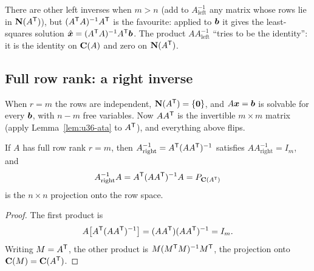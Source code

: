 There are other left inverses when $m>n$ (add to $A^{-1}_{\text{left}}$ any matrix whose rows lie in $\mathbf{N}(A^{\mathsf{T}})$), but $(A^{\mathsf{T}} A)^{-1}A^{\mathsf{T}}$ is the favourite: applied to $\boldsymbol{b}$ it gives the least-squares solution $\hat{\boldsymbol{x}}=(A^{\mathsf{T}} A)^{-1}A^{\mathsf{T}}\boldsymbol{b}$. The product $AA^{-1}_{\text{left}}$ ``tries to be the identity'': it is the identity on $\mathbf{C}(A)$ and zero on $\mathbf{N}(A^{\mathsf{T}})$.

\subsection{Full row rank: a right inverse}

When $r=m$ the rows are independent, $\mathbf{N}(A^{\mathsf{T}})=\{\boldsymbol{0}\}$, and $A\boldsymbol{x}=\boldsymbol{b}$ is solvable for every $\boldsymbol{b}$, with $n-m$ free variables. Now $AA^{\mathsf{T}}$ is the invertible $m\times m$ matrix (apply Lemma~\ref{lem:u36-ata} to $A^{\mathsf{T}}$), and everything above flips.

\begin{theorem}\label{thm:u36-right}
If $A$ has full row rank $r=m$, then $A^{-1}_{\text{right}}=A^{\mathsf{T}}(AA^{\mathsf{T}})^{-1}$ satisfies $AA^{-1}_{\text{right}}=I_m$, and
\[
A^{-1}_{\text{right}}A=A^{\mathsf{T}}(AA^{\mathsf{T}})^{-1}A=P_{\mathbf{C}(A^{\mathsf{T}})}
\]
is the $n\times n$ projection onto the row space.
\end{theorem}
\begin{proof}
The first product is
\[
A\bigl[A^{\mathsf{T}}(AA^{\mathsf{T}})^{-1}\bigr]=(AA^{\mathsf{T}})(AA^{\mathsf{T}})^{-1}=I_m .
\]
Writing $M=A^{\mathsf{T}}$, the other product is $M(M^{\mathsf{T}} M)^{-1}M^{\mathsf{T}}$, the projection onto $\mathbf{C}(M)=\mathbf{C}(A^{\mathsf{T}})$.
\end{proof}

